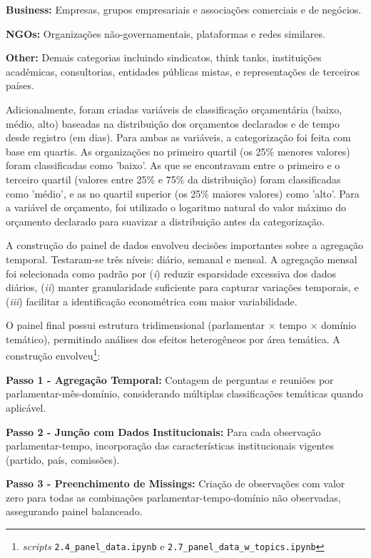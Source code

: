 \textbf{Business:} Empresas, grupos empresariais e associações comerciais e de negócios.

\textbf{NGOs:} Organizações não-governamentais, plataformas e redes similares.

\textbf{Other:} Demais categorias incluindo sindicatos, think tanks, instituições acadêmicas, consultorias, entidades públicas mistas, e representações de terceiros países.

Adicionalmente, foram criadas variáveis de classificação orçamentária (baixo, médio, alto) baseadas na distribuição dos orçamentos declarados e de tempo desde registro (em dias). Para ambas as variáveis, a categorização foi feita com base em quartis. As organizações no primeiro quartil (os 25\% menores valores) foram classificadas como 'baixo'. As que se encontravam entre o primeiro e o terceiro quartil (valores entre 25\% e 75\% da distribuição) foram classificadas como 'médio', e as no quartil superior (os 25\% maiores valores) como 'alto'. Para a variável de orçamento, foi utilizado o logaritmo natural do valor máximo do orçamento declarado para suavizar a distribuição antes da categorização.

A construção do painel de dados envolveu decisões importantes sobre a agregação temporal. Testaram-se três níveis: diário, semanal e mensal. A agregação mensal foi selecionada como padrão por (\textit{i}) reduzir esparsidade excessiva dos dados diários, (\textit{ii}) manter granularidade suficiente para capturar variações temporais, e (\textit{iii}) facilitar a identificação econométrica com maior variabilidade.

O painel final possui estrutura tridimensional (parlamentar × tempo × domínio temático), permitindo análises dos efeitos heterogêneos por área temática. A construção envolveu\footnote{\textit{scripts} \texttt{2.4\_panel\_data.ipynb} e \texttt{2.7\_panel\_data\_w\_topics.ipynb}}:

\textbf{Passo 1 - Agregação Temporal:} Contagem de perguntas e reuniões por parlamentar-mês-domínio, considerando múltiplas classificações temáticas quando aplicável.

\textbf{Passo 2 - Junção com Dados Institucionais:} Para cada observação \allowbreak parlamentar-tempo, incorporação das características institucionais vigentes (partido, país, comissões).

\textbf{Passo 3 - Preenchimento de Missings:} Criação de observações com valor zero para todas as combinações parlamentar-tempo-domínio não observadas, assegurando painel balanceado.

